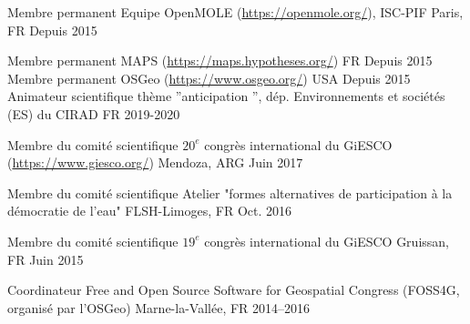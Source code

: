 

\begin{cvhonors}


    \cvhonor
      {Membre permanent} %
      {Equipe OpenMOLE (\url{https://openmole.org/}), ISC-PIF} %
      {Paris, FR} %
      {Depuis 2015} %

    \cvhonor
      {Membre permanent} %
      {MAPS (\url{https://maps.hypotheses.org/})} %
      {FR} %
      {Depuis 2015} %
    \cvhonor
      {Membre permanent} %
      {OSGeo (\url{https://www.osgeo.org/})} %
      {USA} %
      {Depuis 2015} %
  \cvhonor
    {Animateur scientifique} %
    {thème ”anticipation ”, dép. Environnements et sociétés (ES) du CIRAD} %
    {FR} %
    {2019-2020} %

  \cvhonor
    {Membre du comité scientifique} %
    {$20^{e}$ congrès international du GiESCO (\url{https://www.giesco.org/})} %
    {Mendoza, ARG} %
    {Juin 2017} %

  \cvhonor
    {Membre du comité scientifique} %
    {Atelier "formes alternatives de participation à la démocratie de l'eau"} %
    {FLSH-Limoges, FR} %
    {Oct. 2016} %

  \cvhonor
    {Membre du comité scientifique} %
    {$19^{e}$ congrès international du GiESCO} %
    {Gruissan, FR} %
    {Juin 2015} %

\cvhonor
  {Coordinateur} %
  {Free and Open Source Software for Geospatial Congress (FOSS4G, organisé par l'OSGeo)} %
  {Marne-la-Vallée, FR} %
  {2014--2016} %

\end{cvhonors}
